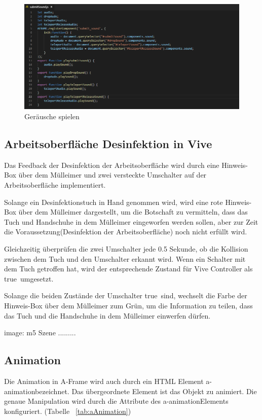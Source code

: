 \begin{figure}[ht]
\vspace*{0.8cm}
\centering
\includegraphics[width=\textwidth]{images/submitSound.png}
\caption[Geräusche spielen]{Geräusche spielen}
\label{fig:submitSound} 
\end{figure}
 
 \subsection{Arbeitsoberfläche Desinfektion in Vive}
 Das Feedback der Desinfektion der Arbeitsoberfläche wird durch eine Hinweis-Box über dem Mülleimer und zwei versteckte Umschalter auf der Arbeitsoberfläche implementiert.
 
 Solange ein Desinfektionstuch in Hand genommen wird, wird eine rote Hinweis-Box über dem Mülleimer dargestellt, um die Botschaft zu vermitteln, dass das Tuch und Handschuhe in dem Mülleimer eingeworfen werden sollen, aber zur Zeit die Voraussetzung(Desinfektion der Arbeitsoberfläche) noch nicht erfüllt wird.
 
 Gleichzeitig überprüfen die zwei Umschalter jede 0.5 Sekunde, ob die Kollision zwischen dem Tuch und den Umschalter erkannt wird. Wenn ein Schalter mit dem Tuch getroffen hat, wird der entsprechende Zustand für Vive Controller als \glqq true\grqq\ umgesetzt.
 
 Solange die beiden Zustände der Umschalter \glqq true\grqq\ sind, wechselt die Farbe der Hinweis-Box über dem Mülleimer zum Grün, um die Information zu teilen, dass das Tuch und die Handschuhe in dem Mülleimer einwerfen dürfen.
 
 image: m5 Szene .........
 
 \subsection{Animation}
 Die Animation in A-Frame wird auch durch ein HTML Element \glqq a-animation\grqq bezeichnet. Das übergeordnete Element ist das Objekt zu animiert. Die genaue Manipulation wird durch die Attribute des \glqq a-animation\grqq Elements konfiguriert. (Tabelle ~\ref{tab:aAnimation})
 
